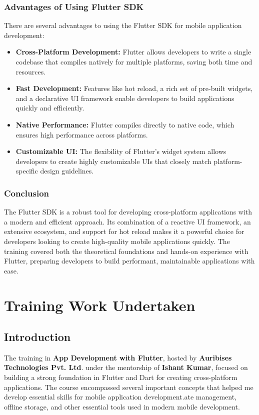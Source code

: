 \documentclass[12pt,a4paper]{report}
\begin{document}
\subsection{Advantages of Using Flutter SDK}
There are several advantages to using the Flutter SDK for mobile application development:
\begin{itemize}
    \item \textbf{Cross-Platform Development:} Flutter allows developers to write a single codebase that compiles natively for multiple platforms, saving both time and resources.
    \item \textbf{Fast Development:} Features like hot reload, a rich set of pre-built widgets, and a declarative UI framework enable developers to build applications quickly and efficiently.
    \item \textbf{Native Performance:} Flutter compiles directly to native code, which ensures high performance across platforms.
    \item \textbf{Customizable UI:} The flexibility of Flutter’s widget system allows developers to create highly customizable UIs that closely match platform-specific design guidelines.
\end{itemize}

\subsection{Conclusion}
The Flutter SDK is a robust tool for developing cross-platform applications with a modern and efficient approach. Its combination of a reactive UI framework, an extensive ecosystem, and support for hot reload makes it a powerful choice for developers looking to create high-quality mobile applications quickly. The training covered both the theoretical foundations and hands-on experience with Flutter, preparing developers to build performant, maintainable applications with ease.


\chapter{Training Work Undertaken}

\section{Introduction}
The training in \textbf{App Development with Flutter}, hosted by \textbf{Auribises Technologies Pvt. Ltd}. under the mentorship of \textbf{Ishant Kumar}, focused on building a strong foundation in Flutter and Dart for creating cross-platform applications. The course encompassed several important concepts that helped me develop essential skills for mobile application development.ate management, offline storage, and other essential tools used in modern mobile development.
\end{document}
